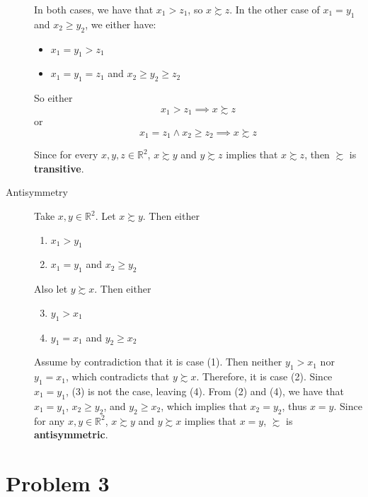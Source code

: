 \documentclass[12pt]{extarticle}
\numberwithin{table}{section}
\numberwithin{figure}{section}
\numberwithin{equation}{section}
\begin{document}
\begin{description}
	      In both cases, we have that $x_1 > z_1$, so $x \succsim z$.
	      In the other case of $x_1 = y_1$ and $x_2 \ge y_2$, we either have:
	      \begin{itemize}
		      \item $x_1 = y_1 > z_1$
		      \item $x_1 = y_1 = z_1$ and $x_2 \ge y_2 \ge z_2$
	      \end{itemize}

	      So either
	      \begin{equation}
		      x_1 > z_1 \implies x \succsim z
	      \end{equation}
	      or
	      \begin{equation}
		      x_1 = z_1 \land x_2 \ge z_2 \implies x \succsim z
	      \end{equation}

	      Since for every $x, y, z \in \mathbb{R}^2$, $x \succsim y$ and $y \succsim z$ implies that $x \succsim z$, then $\succsim$ is \textbf{transitive}.
	\item[Antisymmetry]
	      Take $x, y \in \mathbb{R}^2$. Let $x \succsim y$.
	      Then either
	      \begin{enumerate}
		      \item $x_1 > y_1$
		      \item $x_1 = y_1$ and $x_2 \ge y_2$
	      \end{enumerate}
	      Also let $y \succsim x$. Then either
	      \begin{enumerate}
		      \setcounter{enumi}{2}
		      \item $y_1 > x_1$
		      \item $y_1 = x_1$ and $y_2 \ge x_2$
	      \end{enumerate}
	      Assume by contradiction that it is case (1).
	      Then neither $y_1 > x_1$ nor $y_1 = x_1$, which contradicts that $y \succsim x$. Therefore, it is case (2).
	      Since $x_1 = y_1$, (3) is not the case, leaving (4).
	      From (2) and (4), we have that $x_1 = y_1$, $x_2 \ge y_2$, and $y_2 \ge x_2$, which implies that $x_2 = y_2$, thus $x = y$. Since for any $x, y \in \mathbb{R}^2$, $x \succsim y$ and $y \succsim x$ implies that $x = y$, $\succsim$ is \textbf{antisymmetric}.
\end{description}

\section*{Problem 3}
\end{document}
